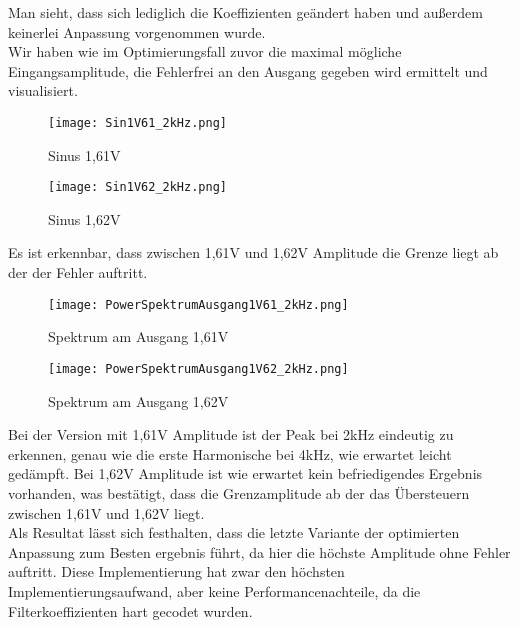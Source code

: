 Man sieht, dass sich lediglich die Koeffizienten geändert haben und außerdem keinerlei Anpassung vorgenommen wurde.\\
Wir haben wie im Optimierungsfall zuvor die maximal mögliche Eingangsamplitude, die Fehlerfrei an den Ausgang gegeben wird ermittelt und visualisiert.
\begin{figure}[H]
  \centering
    \texttt{[image: Sin1V61\_2kHz.png]}
  \caption{Sinus 1,61V}
  \label{fig:Sin1V61_2kHz}
\end{figure}
\begin{figure}[H]
  \centering
    \texttt{[image: Sin1V62\_2kHz.png]}
  \caption{Sinus 1,62V}
  \label{fig:Sin1V62_2kHz}
\end{figure}
Es ist erkennbar, dass zwischen 1,61V und 1,62V Amplitude die Grenze liegt ab der der Fehler auftritt.
\begin{figure}[H]
  \centering
    \texttt{[image: PowerSpektrumAusgang1V61\_2kHz.png]}
  \caption{Spektrum am Ausgang 1,61V}
  \label{fig:PowerSpektrumAusgang1V61_2kHz}
\end{figure}
\begin{figure}[H]
  \centering
    \texttt{[image: PowerSpektrumAusgang1V62\_2kHz.png]}
  \caption{Spektrum am Ausgang 1,62V}
  \label{fig:PowerSpektrumAusgang1V62_2kHz}
\end{figure}
Bei der Version mit 1,61V Amplitude ist der Peak bei 2kHz eindeutig zu erkennen, genau wie die erste Harmonische bei 4kHz, wie erwartet leicht gedämpft. Bei 1,62V Amplitude ist wie erwartet kein befriedigendes Ergebnis vorhanden, was bestätigt, dass die Grenzamplitude ab der das Übersteuern zwischen 1,61V und 1,62V liegt.\\ 
Als Resultat lässt sich festhalten, dass die letzte Variante der optimierten Anpassung zum Besten ergebnis führt, da hier die höchste Amplitude ohne Fehler auftritt. Diese Implementierung hat zwar den höchsten Implementierungsaufwand, aber keine Performancenachteile, da die Filterkoeffizienten hart gecodet wurden.
